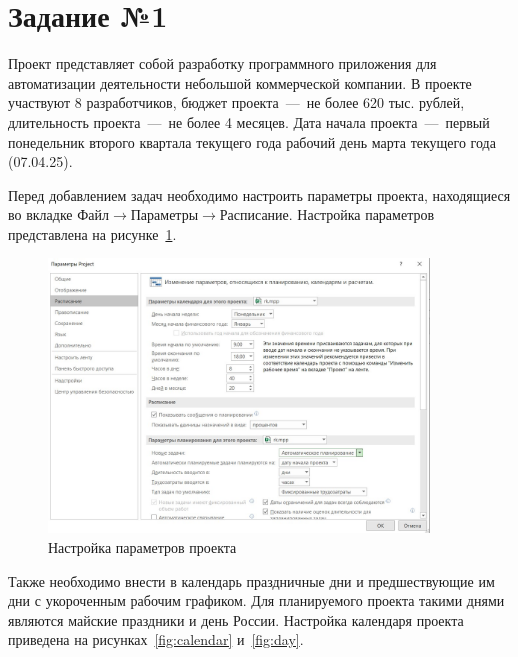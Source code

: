 \setcounter{page}{2}

\section{Задание №1}

Проект представляет собой разработку программного приложения для автоматизации деятельности небольшой коммерческой компании.
В проекте участвуют 8 разработчиков, бюджет проекта~---~не более 620 тыс. рублей, длительность проекта~---~не более 4 месяцев.
Дата начала проекта~---~первый понедельник второго квартала текущего года рабочий день марта текущего года (07.04.25).

Перед добавлением задач необходимо настроить параметры проекта, находящиеся во вкладке $\text{Файл} \rightarrow \text{Параметры} \rightarrow \text{Расписание}$.
Настройка параметров представлена на рисунке~\ref{fig:parameters}.

\begin{figure}[H]
	\centering
	\includegraphics[width=0.9\textwidth]{img/task1/screen1_1.jpg}
	\caption{Настройка параметров проекта}
	\label{fig:parameters}
\end{figure}

Также необходимо внести в календарь праздничные дни и предшествующие им дни с укороченным рабочим графиком.
Для планируемого проекта такими днями являются майские праздники и день России.
Настройка календаря проекта приведена на рисунках~\ref{fig:calendar} и~\ref{fig:day}.

